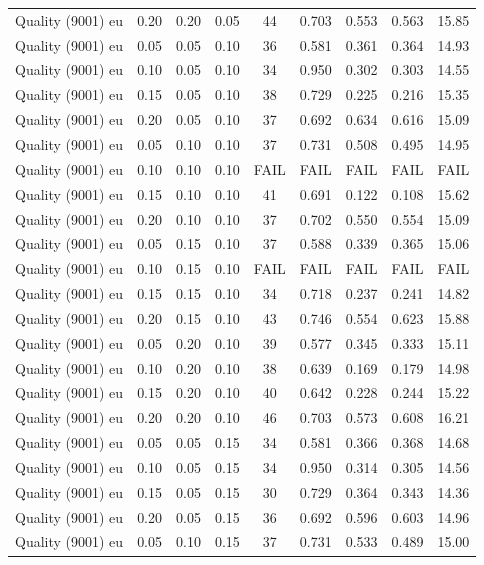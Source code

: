 \begin{longtable}[t]{lrrrccccc}
\addlinespace
Quality (9001) eu & 0.20 & 0.20 & 0.05 & 44 & 0.703 & 0.553 & 0.563 & 15.85\\
Quality (9001) eu & 0.05 & 0.05 & 0.10 & 36 & 0.581 & 0.361 & 0.364 & 14.93\\
Quality (9001) eu & 0.10 & 0.05 & 0.10 & 34 & 0.950 & 0.302 & 0.303 & 14.55\\
Quality (9001) eu & 0.15 & 0.05 & 0.10 & 38 & 0.729 & 0.225 & 0.216 & 15.35\\
Quality (9001) eu & 0.20 & 0.05 & 0.10 & 37 & 0.692 & 0.634 & 0.616 & 15.09\\
\addlinespace
Quality (9001) eu & 0.05 & 0.10 & 0.10 & 37 & 0.731 & 0.508 & 0.495 & 14.95\\
Quality (9001) eu & 0.10 & 0.10 & 0.10 & FAIL & FAIL & FAIL & FAIL & FAIL\\
Quality (9001) eu & 0.15 & 0.10 & 0.10 & 41 & 0.691 & 0.122 & 0.108 & 15.62\\
Quality (9001) eu & 0.20 & 0.10 & 0.10 & 37 & 0.702 & 0.550 & 0.554 & 15.09\\
Quality (9001) eu & 0.05 & 0.15 & 0.10 & 37 & 0.588 & 0.339 & 0.365 & 15.06\\
\addlinespace
Quality (9001) eu & 0.10 & 0.15 & 0.10 & FAIL & FAIL & FAIL & FAIL & FAIL\\
Quality (9001) eu & 0.15 & 0.15 & 0.10 & 34 & 0.718 & 0.237 & 0.241 & 14.82\\
Quality (9001) eu & 0.20 & 0.15 & 0.10 & 43 & 0.746 & 0.554 & 0.623 & 15.88\\
Quality (9001) eu & 0.05 & 0.20 & 0.10 & 39 & 0.577 & 0.345 & 0.333 & 15.11\\
Quality (9001) eu & 0.10 & 0.20 & 0.10 & 38 & 0.639 & 0.169 & 0.179 & 14.98\\
\addlinespace
Quality (9001) eu & 0.15 & 0.20 & 0.10 & 40 & 0.642 & 0.228 & 0.244 & 15.22\\
Quality (9001) eu & 0.20 & 0.20 & 0.10 & 46 & 0.703 & 0.573 & 0.608 & 16.21\\
Quality (9001) eu & 0.05 & 0.05 & 0.15 & 34 & 0.581 & 0.366 & 0.368 & 14.68\\
Quality (9001) eu & 0.10 & 0.05 & 0.15 & 34 & 0.950 & 0.314 & 0.305 & 14.56\\
Quality (9001) eu & 0.15 & 0.05 & 0.15 & 30 & 0.729 & 0.364 & 0.343 & 14.36\\
\addlinespace
Quality (9001) eu & 0.20 & 0.05 & 0.15 & 36 & 0.692 & 0.596 & 0.603 & 14.96\\
Quality (9001) eu & 0.05 & 0.10 & 0.15 & 37 & 0.731 & 0.533 & 0.489 & 15.00\\

\end{longtable}
